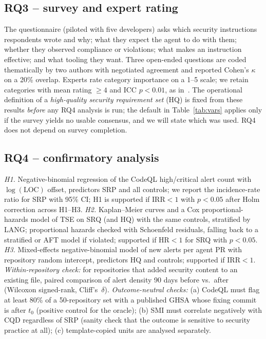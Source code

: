 \documentclass[10pt,conference]{IEEEtran}
\begin{document}
\subsection{RQ3 -- survey and expert rating}
The questionnaire (piloted with five developers) asks which security instructions respondents wrote and why; what they expect the agent to do with them; whether they observed compliance or violations; what makes an instruction effective; and what tooling they want. Three open-ended questions are coded thematically by two authors with negotiated agreement and reported Cohen's $\kappa$ on a 20\% overlap. Experts rate category importance on a 1--5 scale; we retain categories with mean rating $\geq4$ and ICC $p<0.01$, as in~\cite{lu2026modelcard}. The operational definition of a \emph{high-quality security requirement set} (HQ) is fixed from these results \emph{before} any RQ4 analysis is run; the default in Table~\ref{tab:vars} applies only if the survey yields no usable consensus, and we will state which was used. RQ4 does not depend on survey completion.

\subsection{RQ4 -- confirmatory analysis}
\emph{H1.} Negative-binomial regression of the CodeQL high/critical alert count with $\log(\mathrm{LOC})$ offset, predictors SRP and all controls; we report the incidence-rate ratio for SRP with 95\% CI; H1 is supported if IRR$<1$ with $p<0.05$ after Holm correction across H1--H3. \emph{H2.} Kaplan--Meier curves and a Cox proportional-hazards model of TSE on SRQ (and HQ) with the same controls, stratified by LANG; proportional hazards checked with Schoenfeld residuals, falling back to a stratified or AFT model if violated; supported if HR$<1$ for SRQ with $p<0.05$. \emph{H3.} Mixed-effects negative-binomial model of new alerts per agent PR with repository random intercept, predictors HQ and controls; supported if IRR$<1$. \emph{Within-repository check:} for repositories that added security content to an existing file, paired comparison of alert density 90 days before vs.\ after (Wilcoxon signed-rank, Cliff's~$\delta$). \emph{Outcome-neutral checks:} (a) CodeQL must flag at least 80\% of a 50-repository set with a published GHSA whose fixing commit is after $t_0$ (positive control for the oracle); (b) SMI must correlate negatively with CQD regardless of SRP (sanity check that the outcome is sensitive to security practice at all); (c) template-copied units are analysed separately.
\end{document}
